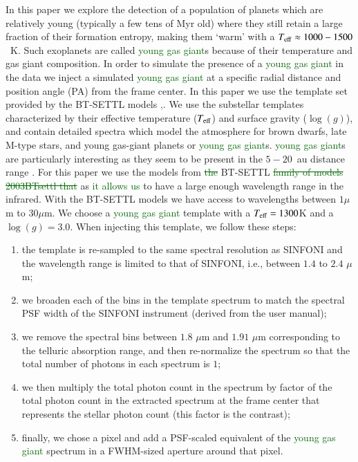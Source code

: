 \documentclass{aa}
\newcommand{\newchange}[1]{\textcolor{darkgreen}{#1}}
\begin{document}
In this paper we explore the detection of a population of planets which are relatively young (typically a few tens of Myr old) where they still retain a large fraction of their formation entropy, making them `warm' with a $T_{\rm eff}\approx 1000 - 1500$~K.
Such exoplanets are called \newchange{young gas giant}s because of their temperature and gas giant composition.
In order to simulate the presence of a \newchange{young gas giant} in the data we inject a simulated \newchange{young gas giant} at a specific radial distance and position angle (PA) from the frame center.
In this paper we use the template set provided by the BT-SETTL models \citep{1997Allard, 2011Allard,2003BTsettl}\newchange{,\citep[][]{2003BTsettl}}. 
We use the substellar templates characterized by their effective temperature ($T_{\rm{eff}}$) and surface gravity ($\log(g)$), and contain detailed spectra which model the atmosphere for brown dwarfs, late M-type stars, and young gas-giant planets or \newchange{young gas giant}s.
\newchange{young gas giant}s are particularly interesting as they seem to be present in the $5-20$~au distance range \cite{2016Bryan}.
For this paper we use the models from \newchange{\sout{the}} BT-SETTL \newchange{\sout{family of models 2003BTsettl that}} as \newchange{it allows us} to have a large enough wavelength range in the infrared. 
With the BT-SETTL models we have access to wavelengths between $1\mu$m to $30\mu$m.
We choose a \newchange{young gas giant} template with a $T_{\rm eff} = 1300$K and a $\log(g)=3.0$.
When injecting this template, we follow these steps:
\begin{enumerate}
    \item the template is re-sampled to the same spectral resolution as SINFONI and the wavelength range is limited to that of SINFONI, i.e., between $1.4$ to $2.4$ $\mu$m;
    \item we broaden each of the bins in the template spectrum to match the spectral PSF width of the SINFONI instrument (derived from the user manual);
    \item we remove the spectral bins between $1.8$ $\mu$m and $1.91$ $\mu$m corresponding to the telluric absorption range, and then re-normalize the spectrum so that the total number of photons in each spectrum is $1$;
    \item we then multiply the total photon count in the spectrum by factor of the total photon count in the extracted spectrum at the frame center that represents the stellar photon count (this factor is the contrast);
    \item finally, we chose a pixel and add a PSF-scaled equivalent of the \newchange{young gas giant} spectrum in a FWHM-sized aperture around that pixel.
\end{enumerate}
\end{document}
